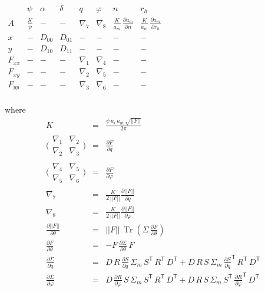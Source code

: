 \documentclass[modern]{aastex62}
\newcommand{\transpose}[1]{{#1}^{\!\mathsf T}}
\renewcommand{\det}[1]{||{#1}||}
\DeclareMathOperator{\trace}{Tr}
\begin{document}
\begin{center}
$
\begin{array}{c|ccccccc}
 & \psi & \alpha & \delta & q & \varphi & n & r_h \\
\hline
A      &  \frac{K}{\psi} & -      & -      & \nabla_7 & \nabla_8 &  \frac{K}{a_m}\, \frac{\partial a_m}{\partial n} & \frac{K}{a_m} \,\frac{\partial a_m}{\partial r_h} \\
x      & -         & D_{00} & D_{01} & -        & -        & -               & - \\
y      & -         & D_{10} & D_{11} & -        & -        & -               & - \\
F_{xx} & -         & -      & -      & \nabla_1 & \nabla_4 & -               & - \\
F_{xy} & -         & -      & -      & \nabla_2 & \nabla_5 & -               & - \\
F_{yy} & -         & -      & -      & \nabla_3 & \nabla_6 & -               & - \\
\end{array}
$
\end{center}

where
\begin{eqnarray}
K & = & \frac{\psi \, a_\ell \, a_m \, \sqrt{\det{F}}}{2\pi} \nonumber \\
\bigl(
  \begin{smallmatrix}
    {\nabla_1} & {\nabla_2} \\
    {\nabla_2} & {\nabla_3}
  \end{smallmatrix}
\bigr)
  & = & \frac{\partial F}{\partial q} \nonumber \\
\bigl(
  \begin{smallmatrix}
    {\nabla_4} & {\nabla_5} \\
    {\nabla_5} & {\nabla_6}
  \end{smallmatrix}
\bigr)
  & = & \frac{\partial F}{\partial \varphi} \nonumber \\
\nabla_7 & = & \frac{ K }{2 \, \det{F}}\frac{\partial\det{F}}{\partial q} \nonumber \\
\nabla_8 & = & \frac{ K }{2 \, \det{F}}\frac{\partial\det{F}}{\partial \varphi} \nonumber \\
\frac{\partial \det{F}}{\partial \theta} & = & \det{F}\, \trace(\Sigma \, \frac{\partial F}{\partial\theta}) \nonumber \\
\frac{\partial F}{\partial \theta} & = & -F\, \frac{\partial \Sigma}{\partial \theta} \, F \nonumber \\
\frac{\partial \Sigma}{\partial q} & = & D\, R\, \frac{\partial S}{\partial q} \, \Sigma_m \, \transpose{S} \, \transpose{R} \, \transpose{D} + D\, R\, S \, \Sigma_m \, \transpose{\frac{\partial S}{\partial q}} \, \transpose{R} \, \transpose{D} \nonumber \\
\frac{\partial \Sigma}{\partial \varphi} & = & D\, \frac{\partial R}{\partial \varphi} \, S\, \Sigma_m \, \transpose{S} \, \transpose{R} \, \transpose{D} +  D\, R\, S \, \Sigma_m \, \transpose{S} \, \transpose{\frac{\partial R}{\partial \varphi}} \, \transpose{D} \nonumber \\
\end{eqnarray}
\end{document}

